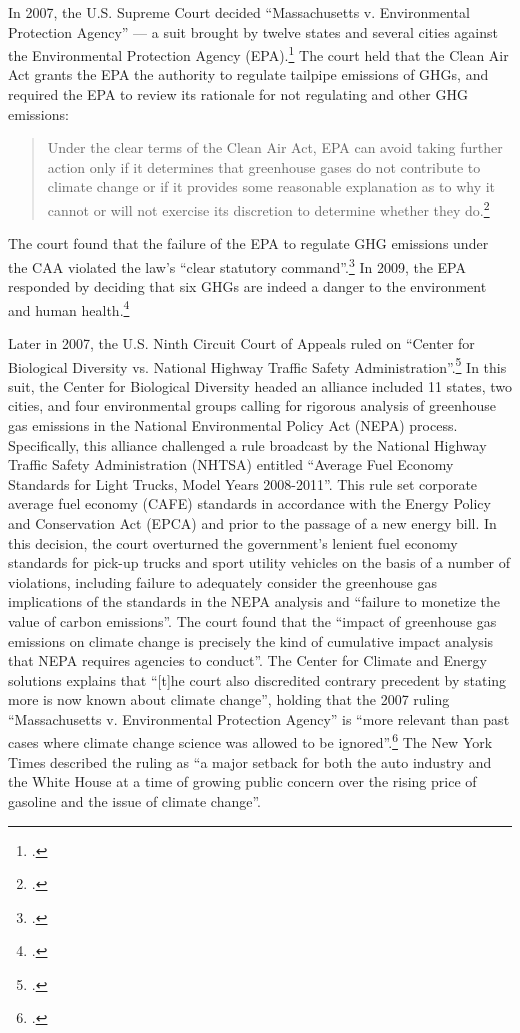 In 2007, the U.S. Supreme Court decided ``Massachusetts v. Environmental Protection Agency'' --- a suit brought by twelve states and several cities against the Environmental Protection Agency (EPA).\footcite[][]{MassVEPA}
The court held that the Clean Air Act grants the EPA the authority to regulate tailpipe emissions of GHGs, and required the EPA to review its rationale for not regulating  and other GHG emissions:
\begin{quote}
Under the clear terms of the Clean Air Act, EPA can avoid taking further action only if it determines that greenhouse gases do not contribute to climate change or if it provides some reasonable explanation as to why it cannot or will not exercise its discretion to determine whether they do.\footcite[][p. 30]{MassVEPA}
\end{quote}
The court found that the failure of the EPA to regulate GHG emissions under the CAA violated the law's ``clear statutory command''.\footcite[See: ][]{EPAhaspower}
In 2009, the EPA responded by deciding that six GHGs are indeed a danger to the environment and human health.\footcite[][]{GreenFigleaf}



Later in 2007, the U.S. Ninth Circuit Court of Appeals ruled on ``Center for Biological Diversity vs. National Highway Traffic Safety Administration''.\footcite[][]{9thcircuitHighway}
In this suit, the Center for Biological Diversity headed an alliance included 11 states, two cities, and four environmental groups calling for rigorous analysis of greenhouse gas emissions in the National Environmental Policy Act (NEPA) process. 
Specifically, this alliance challenged a rule broadcast by the National Highway Traffic Safety Administration (NHTSA) entitled ``Average Fuel Economy Standards for Light Trucks, Model Years 2008-2011''.
This rule set corporate average fuel economy (CAFE) standards in accordance with the Energy Policy and Conservation Act (EPCA) and prior to the passage of a new energy bill.  
In this decision, the court overturned the government's lenient fuel economy standards for pick-up trucks and sport utility vehicles on the basis of a number of violations, including failure to adequately consider the greenhouse gas implications of the standards in the NEPA analysis and ``failure to monetize the value of carbon emissions''.
The court found that the ``impact of greenhouse gas emissions on climate change is precisely the kind of cumulative impact analysis that NEPA requires agencies to conduct''.
The Center for Climate and Energy solutions explains that ``[t]he court also discredited contrary precedent by stating more is now known about climate change'', holding that the 2007 ruling ``Massachusetts v. Environmental Protection Agency'' is ``more relevant than past cases where climate change science was allowed to be ignored''.\footcite[][]{NEPACases}
The New York Times described the ruling as ``a major setback for both the auto industry and the White House at a time of growing public concern over the rising price of gasoline and the issue of climate change''.



